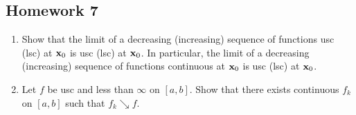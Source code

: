 \subsection{Homework 7}
\begin{problem}
\begin{enumerate}[label=(\alph*)]
\item Show that the limit of a decreasing (increasing) sequence of
  functions usc (lsc) at $\mathbf{x}_0$ is usc (lsc) at $\mathbf{x}_0$. In particular,
  the limit of a decreasing (increasing) sequence of functions continuous
  at $\mathbf{x}_0$ is usc (lsc) at $\mathbf{x}_0$.
\item Let $f$ be usc and less than $\infty$ on $[a,b]$. Show that there
  exists continuous $f_k$ on $[a,b]$ such that $f_k\searrow f$.
\end{enumerate}
\end{problem}
